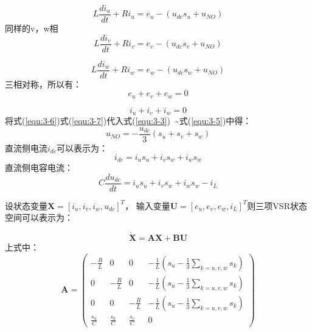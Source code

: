 \begin{equation}
	L\frac{di_{u}}{dt}+Ri_{u}=e_{u}-(u_{dc}s_{u}+u_{NO})
\end{equation}
同样的v，w相
\begin{equation}
	L\frac{di_{v}}{dt}+Ri_{v}=e_{v}-(u_{dc}s_{v}+u_{NO})
	\label{equ:3-4}
\end{equation}

\begin{equation}
	L\frac{di_{w}}{dt}+Ri_{w}=e_{w}-(u_{dc}s_{w}+u_{NO})
	\label{equ:3-5}
\end{equation}
三相对称，所以有：
\begin{equation}
	e_{u}+e_{v}+e_{w}=0
	\label{equ:3-6}
\end{equation}

\begin{equation}
	i_{u}+i_{v}+i_{w}=0 
	\label{equ:3-7}
\end{equation}
将式(\ref{equ:3-6})式(\ref{equ:3-7})代入式(\ref{equ:3-3})~\~{}式(\ref{equ:3-5})中得：
\begin{equation}
	u_{NO}=-\frac{u_{dc}}{3} \left ( s_{u}+s_{v}+s_{w}  \right )
\end{equation}
直流侧电流$i_{dc}$可以表示为：
\begin{equation}
	i_{dc}=i_{u}s_{u}+i_{v}s_{w}+i_{w}s_{w}
\end{equation}
直流侧电容电流：
\begin{equation}
	C\frac{du_{dc}}{dt}=i_{u}s_{u}+i_{v}s_{w}+i_{w}s_{w}-i_{L}
\end{equation}

设状态变量$\boldsymbol{X}=[i_{u},i_{v},i_{w},u_{dc}]^{T}$，
输入变量$\boldsymbol{U}=[e_{u},e_{v},e_{w},i_{L}]^{T}$则三项VSR状态空间可以表示为：

\begin{equation}
	\boldsymbol{\dot{X}}=\boldsymbol{AX}+\boldsymbol{BU}
\end{equation}
上式中：
\begin{equation}
	\boldsymbol{A}=
	\begin{pmatrix}
		-\frac{R}{L}    & 0               & 0               & -\frac{1}{L}  ( s_{u}-\frac{1}{3} \sum\limits_{k=u,v,w} s_{k}  ) \\
		0               & -\frac{R}{L}    & 0               & -\frac{1}{L}  ( s_{u}-\frac{1}{3} \sum\limits_{k=u,v,w} s_{k}  ) \\
		0               & 0               & -\frac{R}{L}    & -\frac{1}{L}  ( s_{u}-\frac{1}{3} \sum\limits_{k=u,v,w} s_{k}  ) \\
		\frac{s_{a}}{C} & \frac{s_{b}}{C} & \frac{s_{c}}{C} & 0
	\end{pmatrix}
\end{equation}


